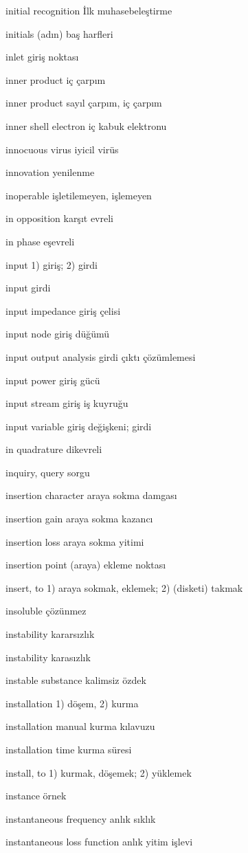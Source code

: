 \documentclass[12pt,fleqn]{article}\usepackage{../../common}
\begin{document}
initial recognition İlk muhasebeleştirme

initials (adın) baş harfleri

inlet giriş noktası

inner product iç çarpım

inner product sayıl çarpım, iç çarpım

inner shell electron iç kabuk elektronu

innocuous virus iyicil virüs

innovation yenilenme

inoperable işletilemeyen, işlemeyen

in opposition karşıt evreli

in phase eşevreli

input 1) giriş; 2) girdi

input girdi

input impedance giriş çelisi

input node giriş düğümü

input output analysis girdi çıktı çözümlemesi

input power giriş gücü

input stream giriş iş kuyruğu

input variable giriş değişkeni; girdi

in quadrature dikevreli

inquiry, query sorgu

insertion character araya sokma damgası

insertion gain araya sokma kazancı

insertion loss araya sokma yitimi

insertion point (araya) ekleme noktası

insert, to 1) araya sokmak, eklemek; 2) (disketi) takmak

insoluble çözünmez

instability kararsızlık

instability karasızlık

instable substance kalimsiz özdek

installation 1) döşem, 2) kurma

installation manual kurma kılavuzu

installation time kurma süresi

install, to 1) kurmak, döşemek; 2) yüklemek

instance örnek

instantaneous frequency anlık sıklık

instantaneous loss function anlık yitim işlevi
\end{document}
